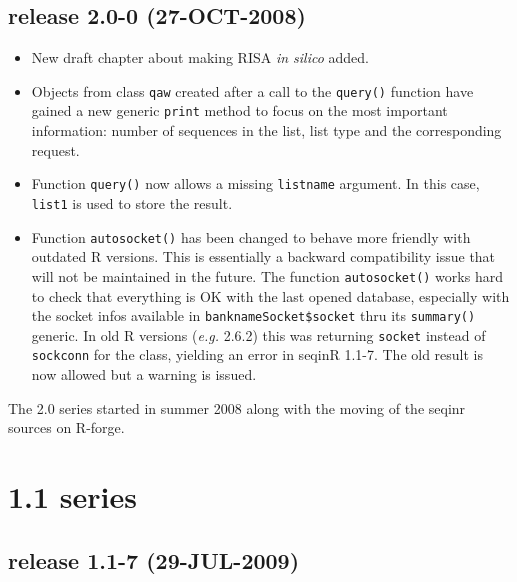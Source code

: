 \documentclass{article}
\begin{document}
\subsection*{release 2.0-0 (27-OCT-2008)}

\begin{itemize}

\item New draft chapter about making RISA \textit{in silico} added.

\item Objects from class \texttt{qaw} created after a call to the
  \texttt{query()} function have gained a new generic \texttt{print}
  method to focus on the most important information: number
  of sequences in the list, list type and the corresponding request.

\item Function \texttt{query()} now allows a missing \texttt{listname}
  argument. In this case, \texttt{list1} is used to store the
  result.

\item Function \texttt{autosocket()} has been changed to behave more
  friendly with outdated R versions. This is essentially a backward
  compatibility issue that will not be maintained in the future.
  The function \texttt{autosocket()} works hard to check that everything
  is OK with the last opened database, especially with the socket
  infos available in \texttt{banknameSocket\$socket} thru its
  \texttt{summary()} generic. In old R versions (\textit{e.g.} 2.6.2) this
  was returning \texttt{socket} instead of \texttt{sockconn} for the
  class, yielding an error in seqinR 1.1-7. The old result is now
  allowed but a warning is issued.

\end{itemize}

The 2.0 series started in summer 2008 along with the moving
of the seqinr sources on R-forge.

\section*{1.1 series}

\subsection*{release 1.1-7 (29-JUL-2009)}
\end{document}
